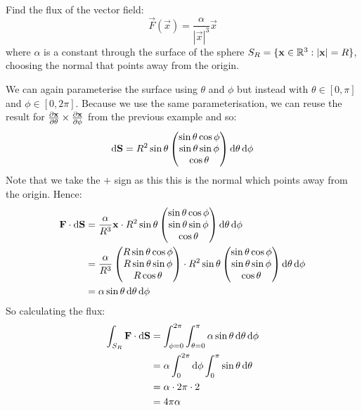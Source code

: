 \documentclass[../main.tex]{subfiles}
\begin{document}
\begin{example}
  Find the flux of the vector field:
  \[
    \vec{F}(\vec{x}) = \frac{\alpha}{|\vec{x}|^3} \vec{x}
  \]
  where $\alpha$ is a constant through the surface of the sphere $S_R = \{\mathbf{\bm{x}} \in \mathbb{R}^3: |\mathbf{\bm{x}}| = R\}$, choosing the normal that points away from the origin.

  We can again parameterise the surface using $\theta$ and $\phi$ but instead with $\theta \in [0, \pi]$ and $\phi \in [0, 2\pi]$.
  Because we use the same parameterisation, we can reuse the result for $\pderiv{\vec{x}}{\theta} \times \pderiv{\vec{x}}{\phi}$ from the previous example and so:
  \[
    \d{\vec{S}} = R^2 \sin \theta \begin{pmatrix}
    \sin \theta \cos \phi \\
    \sin \theta \sin \phi \\
    \cos \theta \\
    \end{pmatrix} \d{\theta} \d{\phi}
  \]
  Note that we take the $+$ sign as this this is the normal which points away from the origin.
  Hence:
  \begin{align*}
    \vec{F} \cdot \d{\vec{S}} &= \frac{\alpha}{R^3} \vec{x} \cdot R^2 \sin \theta \begin{pmatrix}
    \sin \theta \cos \phi \\
    \sin \theta \sin \phi \\
    \cos \theta \\
    \end{pmatrix} \d{\theta} \d{\phi} \\
                              &= \frac{\alpha}{R^3} \begin{pmatrix}
    R \sin \theta \cos \phi \\
    R \sin \theta \sin \phi \\
    R \cos \theta \\
    \end{pmatrix} \cdot R^2 \sin \theta \begin{pmatrix}
    \sin \theta \cos \phi \\
    \sin \theta \sin \phi \\
    \cos \theta \\
    \end{pmatrix} \d{\theta} \d{\phi} \\
                              &= \alpha \sin \theta \d{\theta} \d{\phi}
  \end{align*}
  So calculating the flux:
  \begin{align*}
    \int_{S_R} \vec{F} \cdot \d{\vec{S}} &= \int_{\phi = 0}^{2\pi} \int_{\theta = 0}^{\pi} \alpha \sin \theta \d{\theta} \d{\phi}  \\
                                         &= \alpha \int_{0}^{2\pi} \d{\phi} \int_{0}^{\pi} \sin \theta \d{\theta} \\
                                         &= \alpha \cdot 2\pi \cdot 2 \\
                                         &= 4 \pi \alpha
  \end{align*}
\end{example}
\end{document}
